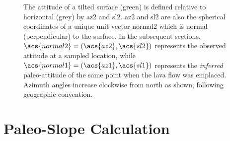 \begin{figure}
    {\caption[Pole to plane $\acs{normal2}=(\acs{az2},\acs{sl2})$]{The attitude of a tilted surface (green) is defined relative to horizontal (grey) by \ac{az2} and \ac{sl2}. \acs{az2} and \acs{sl2} are also the spherical coordinates of a unique unit vector \acs{normal2} which is normal (perpendicular) to the surface. In the subsequent sections, $\acs{normal2}=(\acs{az2},\acs{sl2})$ represents the observed attitude at a sampled location, while $\acs{normal1}=(\acs{az1},\acs{sl1})$ represents the \emph{inferred} paleo-attitude of the same point when the lava flow was emplaced. Azimuth angles increase clockwise from \acf{north} as shown, following geographic convention.}\label{fig:surface}}
    {}
\end{figure}

\section{Paleo-Slope Calculation}

